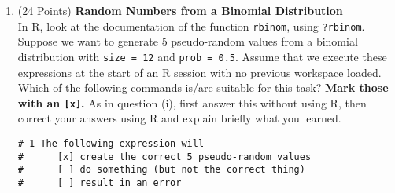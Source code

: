 \documentclass[12pt,letterpaper,final]{article}\usepackage[]{graphicx}\usepackage[]{xcolor}
\begin{document}
\begin{enumerate}
Mark one of these two options with an x, i.e., \verb|[x]|: \\
\verb|[x]| My answer and the answer from R are matching. \\
\verb|[ ]| My answer and the answer from R are {\bf not} matching. 
I made this mistake / overlooked this detail: {\bf Explain!} \\


\hrule


\begin{verbatim}
# 8 The following expression will
#      [ ] make the correct assignment
#      [ ] do something (but not the correct assignment)
#      [x] result in an error

jjj < - - 5
\end{verbatim}

The actual result in R is: 
\begin{verbatim}
[1] TRUE
\end{verbatim}


Mark one of these two options with an x, i.e., \verb|[x]|: \\
\verb|[ ]| My answer and the answer from R are matching. \\
\verb|[x]| My answer and the answer from R are {\bf not} matching. 
I made this mistake / overlooked this detail: I assumed that r would recognize that it should have been an assignment. The extra space would
result in an error. Now I see that double negatives are allowed in r. \\


\newpage


\item (24 Points) {\bf Random Numbers from a Binomial Distribution} \\
In R, look at the documentation of the function {\tt rbinom}, using  {\tt ?rbinom}.
Suppose we want to generate 5 pseudo-random values from a binomial distribution with 
\verb|size = 12| and \verb|prob = 0.5|. 
Assume that we execute these expressions at the start of an R session with no 
previous workspace loaded.
Which of the following commands
is/are suitable for this task? {\bf Mark those with an \verb|[x]|.}
As in question (i), first answer this without using R, 
then correct your answers using R and explain briefly what you learned.


\begin{verbatim}
# 1 The following expression will
#      [x] create the correct 5 pseudo-random values
#      [ ] do something (but not the correct thing)
#      [ ] result in an error


\end{verbatim}
\end{enumerate}
\end{document}
